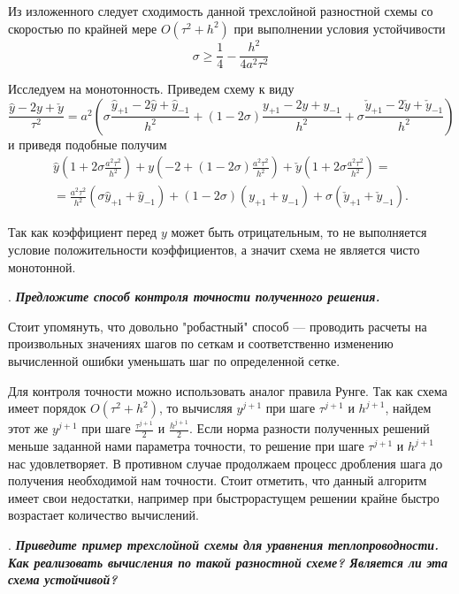 \documentclass[12pt, a4paper]{article}
\newcommand{\widecheck}[1]{\check{#1}}
\newcounter{mycounter}
\newcommand{\quastion}[1]{%
	\stepcounter{mycounter}%
	\textbf{\themycounter}.  %
	\textbf{\textit{#1}}
	
}
\newcommand{\down}[1]{\widecheck{#1}}
\begin{document}
	Из изложенного следует сходимость данной трехслойной разностной схемы со скоростью по крайней мере $O(\tau^2 + h^2)$ при выполнении условия устойчивости
	\begin{equation*}
		\sigma \ge \frac{1}{4} - \frac{h^2}{4a^2 \tau^2}
	\end{equation*}
	
	Исследуем на монотонность. Приведем схему к виду
	\begin{equation*}
		\frac{\hat{y} - 2y + \widecheck{y}}{\tau^2} = a^2 \left( \sigma \frac{\hat{y}_{+1} - 2 \hat{y} + \hat{y}_{-1}}{h^2} + (1 - 2 \sigma) \frac{y_{+1} - 2 y + y_{-1}}{h^2} + \sigma \frac{\widecheck{y}_{+1} - 2 \widecheck{y} + \widecheck{y}_{-1}}{h^2} \right)
	\end{equation*}
	и приведя подобные получим
		\begin{multline*}
			\hat{y}(1 + 2\sigma \frac{a^2 \tau^2}{h^2}) + y (-2 + (1-2\sigma) \frac{a^2 \tau^2}{h^2}) + \down{y}(1 + 2\sigma \frac{a^2 \tau^2}{h^2}) = \\
			=\frac{a^2 \tau^2}{h^2} (\sigma \hat{y}_{+1} + \hat{y}_{-1}) + (1 - 2\sigma)(y_{+1} + y_{-1}) + \sigma( \down{y}_{+1} + \down{y}_{-1}).
		\end{multline*}
	
	Так как коэффициент перед $y$ может быть отрицательным, то не выполняется условие положительности коэффициентов, а значит схема не является чисто монотонной.
	
	\quastion{Предложите способ контроля точности полученного решения.}
	
	Стоит упомянуть, что довольно "робастный" способ --- проводить расчеты на произвольных значениях шагов по сеткам и соответственно изменению вычисленной ошибки уменьшать шаг по определенной сетке. 
	
	Для контроля точности можно использовать аналог правила Рунге. Так как схема имеет порядок $O(\tau^2 + h^2)$, то вычисляя $y^{j+1}$ при шаге $\tau^{j+1}$ и $h^{j+1}$, найдем этот же $y^{j+1}$ при шаге $\frac{\tau^{j+1}}{2}$ и $\frac{h^{j+1}}{2}$. Если норма разности полученных решений меньше заданной нами параметра точности, то решение при шаге $\tau^{j+1}$ и $h^{j+1}$ нас удовлетворяет. В противном случае продолжаем процесс дробления шага до получения необходимой нам точности. Стоит отметить, что данный алгоритм имеет свои недостатки, например при быстрорастущем решении крайне быстро возрастает количество вычислений.
	
	
	
	
	\quastion{Приведите пример трехслойной схемы для уравнения теплопроводности. Как реализовать вычисления по такой разностной схеме? Является ли эта схема устойчивой?}
	
\end{document}

